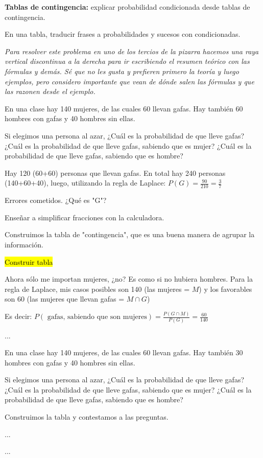 \textbf{Tablas de contingencia:} explicar probabilidad condicionada desde tablas de contingencia.

En una tabla, traducir frases a probabilidades y sucesos con condicionadas.

\textit{Para resolver este problema en uno de los tercios de la pizarra hacemos una raya vertical discontinua a la derecha para ir escribiendo el resumen teórico con las fórmulas y demás. Sé que no les gusta y prefieren primero la teoría y luego ejemplos, pero considero importante que vean de dónde salen las fórmulas y que las razonen desde el ejemplo.}


\begin{problem}[G1]
En una clase hay 140 mujeres, de las cuales 60 llevan gafas. Hay también 60 hombres con gafas y 40 hombres sin ellas.

Si elegimos una persona al azar,
\ppart ¿Cuál es la probabilidad de que lleve gafas?
\ppart ¿Cuál es la probabilidad de que lleve gafas, sabiendo que es mujer?
\ppart ¿Cuál es la probabilidad de que lleve gafas, sabiendo que es hombre?

\solution



\spart Hay 120 (60+60) personas que llevan gafas. En total hay 240 personas (140+60+40), luego, utilizando la regla de Laplace:  $P(G) = \frac{90}{210} = \frac{3}{7}$

\obs Errores cometidos. ¿Qué es "G"?

\obs Enseñar a simplificar fracciones con la calculadora.

\obs Construimos la tabla de "contingencia", que es una buena manera de agrupar la información.

\hl{Construir tabla}

\spart Ahora sólo me importan mujeres, ¿no? Es como si no hubiera hombres. Para la regla de Laplace, mis casos posibles son 140 (las mujeres = $M$) y los favorables son 60 (las mujeres que llevan gafas = $M\cap G$)

Es decir: $P(\text{ gafas, sabiendo que son mujeres} ) = \frac{P(G\cap M)}{P(G)} = \frac{60}{140}$

\spart ...

\end{problem}


\begin{problem}[G2]
En una clase hay 140 mujeres, de las cuales 60 llevan gafas. Hay también 30 hombres con gafas y 40 hombres sin ellas.

Si elegimos una persona al azar,
\ppart ¿Cuál es la probabilidad de que lleve gafas?
\ppart ¿Cuál es la probabilidad de que lleve gafas, sabiendo que es mujer?
\ppart ¿Cuál es la probabilidad de que lleve gafas, sabiendo que es hombre?

\solution

\spart Construimos la tabla y contestamos a las preguntas.

\spart ...

\spart ...

\end{problem}

